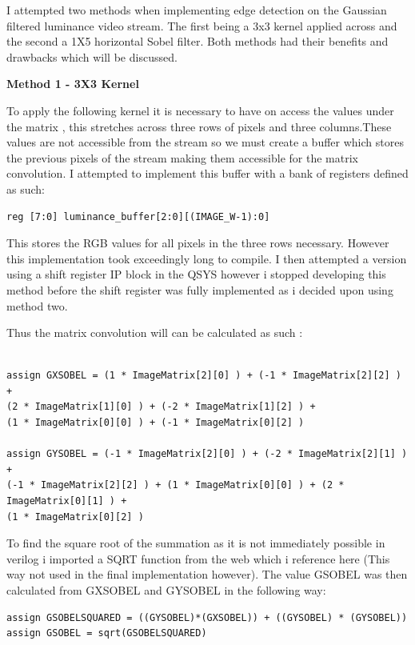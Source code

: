 \documentclass[10pt,twoside]{article}
\begin{document}
I attempted two methods when implementing edge detection on the Gaussian filtered luminance video stream. The first being a 3x3 kernel applied across and the second a 1X5 horizontal Sobel filter. Both methods had their benefits and drawbacks which will be discussed. 

\textbf{Method 1 - 3X3 Kernel}

To apply the following kernel it is necessary to have on access the values under the matrix , this stretches across three rows of pixels and three columns.These values are not accessible from the stream so we must create a buffer which stores the previous pixels of the stream making them accessible for the matrix convolution. I attempted to implement this buffer with a bank of registers defined as such:
\begin{verbatim}
reg [7:0] luminance_buffer[2:0][(IMAGE_W-1):0] 
\end{verbatim}
This stores the RGB values for all pixels in the three rows necessary. However this implementation took exceedingly long to compile. I then attempted a version using a shift register IP block in the QSYS however i stopped developing this method before the shift register was fully implemented as i decided upon using method two.

Thus the matrix convolution will can be calculated as such :
\begin{verbatim}

assign GXSOBEL = (1 * ImageMatrix[2][0] ) + (-1 * ImageMatrix[2][2] ) + 
(2 * ImageMatrix[1][0] ) + (-2 * ImageMatrix[1][2] ) + 
(1 * ImageMatrix[0][0] ) + (-1 * ImageMatrix[0][2] )

assign GYSOBEL = (-1 * ImageMatrix[2][0] ) + (-2 * ImageMatrix[2][1] ) + 
(-1 * ImageMatrix[2][2] ) + (1 * ImageMatrix[0][0] ) + (2 * ImageMatrix[0][1] ) + 
(1 * ImageMatrix[0][2] )

\end{verbatim}
To find the square root of the summation as it is not immediately possible in verilog i imported a SQRT function from the web which i reference here \cite{VerilogROOT} (This way not used in the final implementation however). The value GSOBEL was then calculated from GXSOBEL and GYSOBEL in the following way: 
\begin{verbatim}
assign GSOBELSQUARED = ((GYSOBEL)*(GXSOBEL)) + ((GYSOBEL) * (GYSOBEL)) 
assign GSOBEL = sqrt(GSOBELSQUARED)
\end{verbatim}
\end{document}
